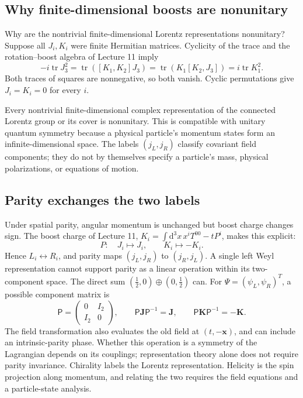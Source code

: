 \documentclass[11pt]{article}
\newcommand{\dd}{\mathrm{d}}
\newcommand{\tr}{\operatorname{tr}}
\begin{document}
\subsection{Why finite-dimensional boosts are nonunitary}
Why are the nontrivial finite-dimensional Lorentz representations
nonunitary? Suppose all \(J_i,K_i\) were finite Hermitian matrices.
Cyclicity of the trace and the rotation--boost algebra of Lecture 11 imply
\[
 -i\tr J_3^2=\tr([K_1,K_2]J_3)
 =\tr(K_1[K_2,J_3])=i\tr K_1^2.
\]
Both traces of squares are nonnegative, so both vanish. Cyclic
permutations give \(J_i=K_i=0\) for every \(i\).
\begin{keyidea}
Every nontrivial finite-dimensional complex representation of the
connected Lorentz group or its cover is nonunitary. This is compatible
with unitary quantum symmetry because a physical particle's momentum
states form an infinite-dimensional space. The labels \((j_L,j_R)\)
classify covariant field components; they do not by themselves specify
a particle's mass, physical polarizations, or equations of motion.
\end{keyidea}

\subsection{Parity exchanges the two labels}
Under spatial parity, angular momentum is unchanged but boost charge
changes sign. The boost charge of Lecture 11,
\(K_i=\int\dd^3x\,x^iT^{00}-tP^i\), makes this explicit:
\[
 P:\quad J_i\mapsto J_i,\qquad K_i\mapsto-K_i.
\]
Hence \(L_i\leftrightarrow R_i\), and parity maps \((j_L,j_R)\) to
\((j_R,j_L)\). A single left Weyl representation cannot support parity
as a linear operation within its two-component space. The direct sum
\((\tfrac12,0)\oplus(0,\tfrac12)\) can. For
\(\Psi=(\psi_L,\psi_R)^T\), a possible component matrix is
\[
 \mathsf P=\begin{pmatrix}0&I_2\\I_2&0\end{pmatrix},\qquad
 \mathsf P\bm J\mathsf P^{-1}=\bm J,\qquad
 \mathsf P\bm K\mathsf P^{-1}=-\bm K.
\]
The field transformation also evaluates the old field at \((t,-\bm x)\),
and can include an intrinsic-parity phase. Whether this operation is
a symmetry of the Lagrangian depends on its couplings; representation
theory alone does not require parity invariance. Chirality labels the
Lorentz representation. Helicity is the spin projection along momentum,
and relating the two requires the field equations and a particle-state analysis.
\end{document}
